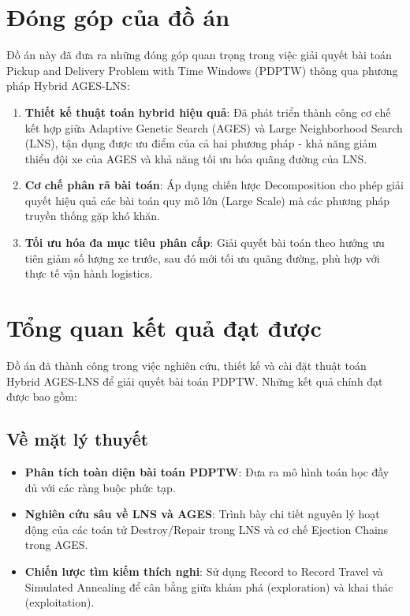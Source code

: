 \documentclass[../DoAn.tex]{subfiles}
\begin{document}
    \section{Đóng góp của đồ án}

    Đồ án này đã đưa ra những đóng góp quan trọng trong việc giải quyết bài toán  Pickup and Delivery Problem with Time Windows (PDPTW) thông qua phương pháp Hybrid AGES-LNS:

    \begin{enumerate}
        \item \textbf{Thiết kế thuật toán hybrid hiệu quả}: Đã phát triển thành công cơ chế kết hợp giữa Adaptive Genetic Search (AGES) và Large Neighborhood Search (LNS), tận dụng được ưu điểm của cả hai phương pháp - khả năng giảm thiểu đội xe của AGES và khả năng tối ưu hóa quãng đường của LNS.

        \item \textbf{Cơ chế phân rã bài toán}: Áp dụng chiến lược Decomposition cho phép giải quyết hiệu quả các bài toán quy mô lớn (Large Scale) mà các phương pháp truyền thống gặp khó khăn.

        \item \textbf{Tối ưu hóa đa mục tiêu phân cấp}: Giải quyết bài toán theo hướng ưu tiên giảm số lượng xe trước, sau đó mới tối ưu quãng đường, phù hợp với thực tế vận hành logistics.
    \end{enumerate}

    \section{Tổng quan kết quả đạt được}

    Đồ án đã thành công trong việc nghiên cứu, thiết kế và cài đặt thuật toán Hybrid AGES-LNS để giải quyết bài toán PDPTW. Những kết quả chính đạt được bao gồm:

    \subsection{Về mặt lý thuyết}

    \begin{itemize}
        \item \textbf{Phân tích toàn diện bài toán PDPTW}: Đưa ra mô hình toán học đầy đủ với các ràng buộc phức tạp.

        \item \textbf{Nghiên cứu sâu về LNS và AGES}: Trình bày chi tiết nguyên lý hoạt động của các toán tử Destroy/Repair trong LNS và cơ chế Ejection Chains trong AGES.

        \item \textbf{Chiến lược tìm kiếm thích nghi}: Sử dụng Record to Record Travel và Simulated Annealing để cân bằng giữa khám phá (exploration) và khai thác (exploitation).
    \end{itemize}
\end{document}
